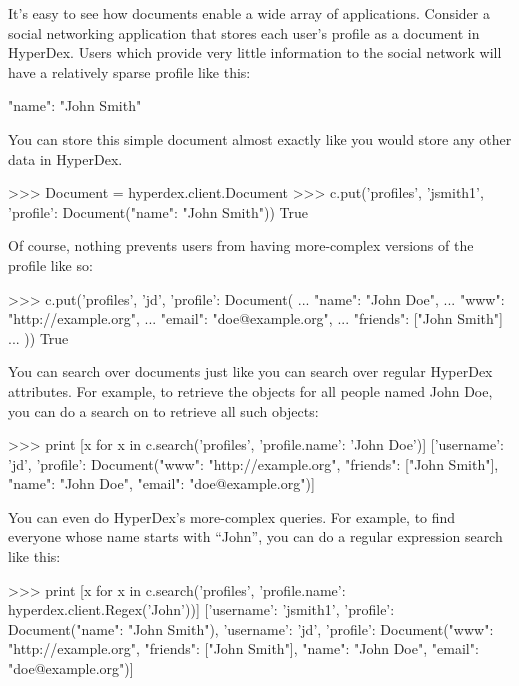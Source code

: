 It's easy to see how documents enable a wide array of applications.  Consider a
social networking application that stores each user's profile as a document in
HyperDex.  Users which provide very little information to the social network
will have a relatively sparse profile like this:

\begin{jsoncode}
{"name": "John Smith"}
\end{jsoncode}

You can store this simple document almost exactly like you would store any other
data in HyperDex.

\begin{pythoncode}
>>> Document = hyperdex.client.Document
>>> c.put('profiles', 'jsmith1', {'profile': Document({"name": "John Smith"})})
True
\end{pythoncode}

Of course, nothing prevents users from having more-complex versions of the
profile like so:

\begin{pythoncode}
>>> c.put('profiles', 'jd', {'profile': Document({
...     "name": "John Doe",
...     "www": "http://example.org",
...     "email": "doe@example.org",
...     "friends": ["John Smith"]
... })})
True
\end{pythoncode}

You can search over documents just like you can search over regular HyperDex
attributes.  For example, to retrieve the objects for all people named John Doe,
you can do a search on  to retrieve all such objects:

\begin{pythoncode}
>>> print [x for x in c.search('profiles', {'profile.name': 'John Doe'})]
[{'username': 'jd', 'profile': Document({"www": "http://example.org", "friends":
["John Smith"], "name": "John Doe", "email": "doe@example.org"})}]
\end{pythoncode}

You can even do HyperDex's more-complex queries.  For example, to find everyone
whose name starts with ``John'', you can do a regular expression search like
this:

\begin{pythoncode}
>>> print [x for x in c.search('profiles', {'profile.name': hyperdex.client.Regex('John')})]
[{'username': 'jsmith1', 'profile': Document({"name": "John Smith"})}, {'username': 'jd', 'profile': Document({"www": "http://example.org", "friends": ["John Smith"], "name": "John Doe", "email": "doe@example.org"})}]
\end{pythoncode}

